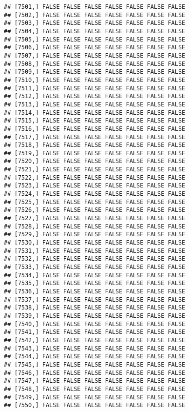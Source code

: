 \documentclass[
]{article}
\begin{document}
\begin{verbatim}
## [7501,] FALSE FALSE FALSE FALSE FALSE FALSE FALSE
## [7502,] FALSE FALSE FALSE FALSE FALSE FALSE FALSE
## [7503,] FALSE FALSE FALSE FALSE FALSE FALSE FALSE
## [7504,] FALSE FALSE FALSE FALSE FALSE FALSE FALSE
## [7505,] FALSE FALSE FALSE FALSE FALSE FALSE FALSE
## [7506,] FALSE FALSE FALSE FALSE FALSE FALSE FALSE
## [7507,] FALSE FALSE FALSE FALSE FALSE FALSE FALSE
## [7508,] FALSE FALSE FALSE FALSE FALSE FALSE FALSE
## [7509,] FALSE FALSE FALSE FALSE FALSE FALSE FALSE
## [7510,] FALSE FALSE FALSE FALSE FALSE FALSE FALSE
## [7511,] FALSE FALSE FALSE FALSE FALSE FALSE FALSE
## [7512,] FALSE FALSE FALSE FALSE FALSE FALSE FALSE
## [7513,] FALSE FALSE FALSE FALSE FALSE FALSE FALSE
## [7514,] FALSE FALSE FALSE FALSE FALSE FALSE FALSE
## [7515,] FALSE FALSE FALSE FALSE FALSE FALSE FALSE
## [7516,] FALSE FALSE FALSE FALSE FALSE FALSE FALSE
## [7517,] FALSE FALSE FALSE FALSE FALSE FALSE FALSE
## [7518,] FALSE FALSE FALSE FALSE FALSE FALSE FALSE
## [7519,] FALSE FALSE FALSE FALSE FALSE FALSE FALSE
## [7520,] FALSE FALSE FALSE FALSE FALSE FALSE FALSE
## [7521,] FALSE FALSE FALSE FALSE FALSE FALSE FALSE
## [7522,] FALSE FALSE FALSE FALSE FALSE FALSE FALSE
## [7523,] FALSE FALSE FALSE FALSE FALSE FALSE FALSE
## [7524,] FALSE FALSE FALSE FALSE FALSE FALSE FALSE
## [7525,] FALSE FALSE FALSE FALSE FALSE FALSE FALSE
## [7526,] FALSE FALSE FALSE FALSE FALSE FALSE FALSE
## [7527,] FALSE FALSE FALSE FALSE FALSE FALSE FALSE
## [7528,] FALSE FALSE FALSE FALSE FALSE FALSE FALSE
## [7529,] FALSE FALSE FALSE FALSE FALSE FALSE FALSE
## [7530,] FALSE FALSE FALSE FALSE FALSE FALSE FALSE
## [7531,] FALSE FALSE FALSE FALSE FALSE FALSE FALSE
## [7532,] FALSE FALSE FALSE FALSE FALSE FALSE FALSE
## [7533,] FALSE FALSE FALSE FALSE FALSE FALSE FALSE
## [7534,] FALSE FALSE FALSE FALSE FALSE FALSE FALSE
## [7535,] FALSE FALSE FALSE FALSE FALSE FALSE FALSE
## [7536,] FALSE FALSE FALSE FALSE FALSE FALSE FALSE
## [7537,] FALSE FALSE FALSE FALSE FALSE FALSE FALSE
## [7538,] FALSE FALSE FALSE FALSE FALSE FALSE FALSE
## [7539,] FALSE FALSE FALSE FALSE FALSE FALSE FALSE
## [7540,] FALSE FALSE FALSE FALSE FALSE FALSE FALSE
## [7541,] FALSE FALSE FALSE FALSE FALSE FALSE FALSE
## [7542,] FALSE FALSE FALSE FALSE FALSE FALSE FALSE
## [7543,] FALSE FALSE FALSE FALSE FALSE FALSE FALSE
## [7544,] FALSE FALSE FALSE FALSE FALSE FALSE FALSE
## [7545,] FALSE FALSE FALSE FALSE FALSE FALSE FALSE
## [7546,] FALSE FALSE FALSE FALSE FALSE FALSE FALSE
## [7547,] FALSE FALSE FALSE FALSE FALSE FALSE FALSE
## [7548,] FALSE FALSE FALSE FALSE FALSE FALSE FALSE
## [7549,] FALSE FALSE FALSE FALSE FALSE FALSE FALSE
## [7550,] FALSE FALSE FALSE FALSE FALSE FALSE FALSE

\end{verbatim}
\end{document}
